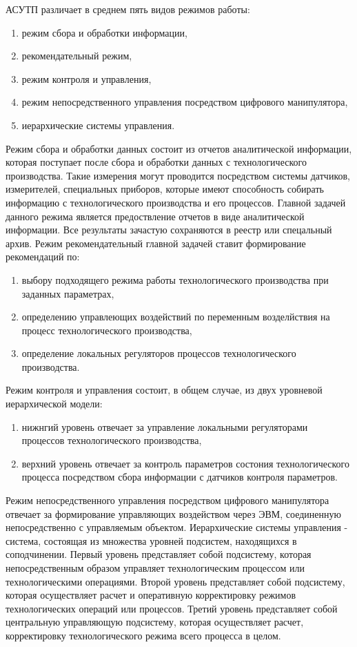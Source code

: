 АСУТП различает в среднем пять видов режимов работы:
\begin{enumerate}
	\item режим сбора и обработки информации,
	\item рекомендательный режим,
	\item режим контроля и управления,
	\item режим непосредственного управления посредством цифрового манипулятора,
	\item иерархические системы управления.
\end{enumerate}

Режим сбора и обработки данных состоит из отчетов аналитической информации, которая поступает после сбора и обработки данных с технологического производства. Такие измерения могут проводится посредством системы датчиков, измерителей, специальных приборов, которые имеют способность собирать информацию с технологического производства и его процессов. Главной задачей данного режима является предоствление отчетов  в виде аналитической информации. Все результаты зачастую сохраняются в реестр или спецальный архив.
Режим рекомендательный главной задачей ставит формирование рекомендаций по:
\begin{enumerate}
	\item выбору подходящего режима работы технологического производства при заданных параметрах,
	\item определению управлеющих воздействий по переменным возделйствия на процесс технологического производства,
	\item определение локальных регуляторов процессов технологического производства.
\end{enumerate}
Режим контроля и управления состоит, в общем случае, из двух уровневой иерархической модели:
\begin{enumerate}
	\item нижнгий уровень отвечает за управление локальными регуляторами процессов технологического производства,
	\item верхний уровень отвечает за контроль параметров состония технологического процесса посредством сбора информации с датчиков контроля параметров.
\end{enumerate}

Режим непосредственного управления посредством цифрового манипулятора отвечает за формирование управляющих воздейством через ЭВМ, соединенную непосредственно с управляемым объектом.
Иерархические системы управления - система, состоящая из множества уровней подсистем, находящихся в соподчинении.
Первый уровень представляет собой подсистему, которая непосредственным образом управляет технологическим процессом или технологическими операциями.
Второй уровень представляет собой подсистему, которая осуществляет расчет и оперативную корректировку режимов технологических операций или процессов.
Третий уровень представляет собой центральную управляющую подсистему, которая осуществляет расчет, корректировку технологического режима всего процесса в целом.

